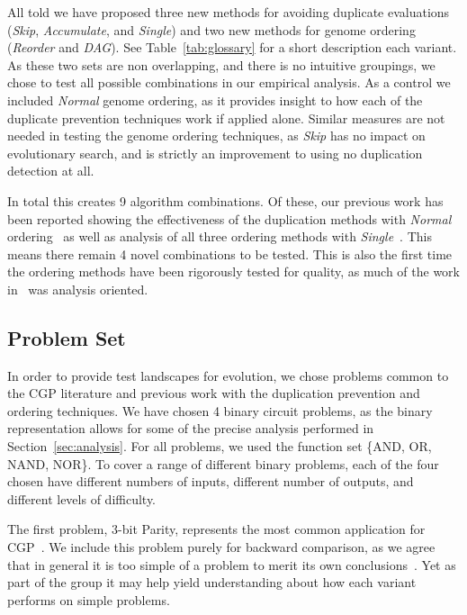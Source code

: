 \documentclass[journal]{IEEEtran}
\begin{document}
All told we have proposed three new methods for avoiding duplicate evaluations
(\emph{Skip}, \emph{Accumulate}, and \emph{Single}) and two new methods for
genome ordering (\emph{Reorder} and \emph{DAG}).
See Table~\ref{tab:glossary} for a short description each variant.
As these two
sets are non overlapping, and there is no intuitive groupings, we chose to test
all possible combinations in our empirical analysis.  As a control we included \emph{Normal} genome ordering,
as it provides insight to how each of the duplicate prevention techniques work
if applied alone.  Similar measures are not needed in testing the genome ordering techniques,
as \emph{Skip} has no impact on evolutionary search, and is strictly an improvement
to using no duplication detection at all.

In total this creates 9 algorithm combinations.  Of these, our previous work
has been reported showing the effectiveness of the duplication methods with \emph{Normal} ordering~\cite{goldman:2013:cgpwaste}
as well as analysis of all three ordering methods with \emph{Single}~\cite{goldman:2013:ordering}.
This means there remain 4 novel combinations to be tested.
This is also the first time the ordering methods
have been rigorously tested for quality, as much of the work in~\cite{goldman:2013:ordering}
was analysis oriented.

\subsection{Problem Set}
In order to provide test landscapes for evolution, we chose problems common to
the CGP literature and previous work with the duplication prevention and ordering
techniques.  We have chosen 4 binary circuit problems, as the binary representation
allows for some of the precise analysis performed in Section~\ref{sec:analysis}.
For all problems, we used the function set \{AND, OR, NAND, NOR\}.
To cover a range of different binary problems, each of the four chosen have
different numbers of inputs, different number of outputs, and different levels
of difficulty.

The first problem, 3-bit Parity, represents the most
common application for
CGP~\cite{yu:2001:neutrality,miller:2006:redundancy,walker:2008:cgpmodules}.
We include this problem purely for backward comparison, as we agree that in general
it is too simple of a problem to merit its own conclusions~\cite{white:2013:bgpb}.
Yet as part of the group it may help yield understanding about how each variant
performs on simple problems.
\end{document}
